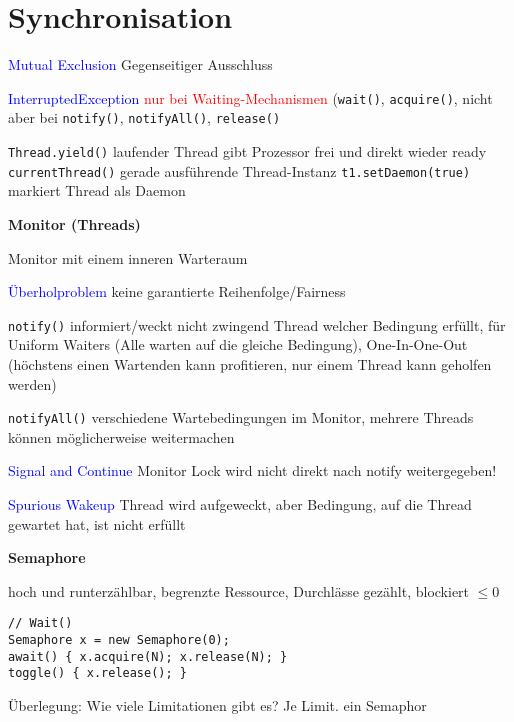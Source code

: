 \section{Synchronisation}

\textcolor{blue}{Mutual Exclusion} Gegenseitiger Ausschluss

\textcolor{blue}{InterruptedException} \textcolor{red}{nur bei Waiting-Mechanismen} (\lstinline{wait()}, \lstinline{acquire()}, nicht aber bei \lstinline{notify()}, \lstinline{notifyAll()}, \lstinline{release()}

\lstinline{Thread.yield()} laufender Thread gibt Prozessor frei und direkt wieder ready \lstinline{currentThread()} gerade ausführende Thread-Instanz \lstinline{t1.setDaemon(true)} markiert Thread als Daemon

\textbf{Monitor (Threads)}

Monitor mit einem inneren Warteraum

\textcolor{blue}{Überholproblem} keine garantierte Reihenfolge/Fairness

\lstinline{notify()} informiert/weckt nicht zwingend Thread welcher Bedingung erfüllt, für Uniform Waiters (Alle warten auf die gleiche Bedingung), One-In-One-Out (höchstens einen Wartenden kann profitieren, nur einem Thread kann geholfen werden)

\lstinline{notifyAll()} verschiedene Wartebedingungen im Monitor, mehrere Threads können möglicherweise weitermachen

\textcolor{blue}{Signal and Continue} Monitor Lock wird nicht direkt nach notify weitergegeben!

\textcolor{blue}{Spurious Wakeup} Thread wird aufgeweckt, aber Bedingung, auf die Thread gewartet hat, ist nicht erfüllt

\textbf{Semaphore}

hoch und runterzählbar, begrenzte Ressource, Durchlässe gezählt, blockiert $\le 0$

\begin{lstlisting}
// Wait()
Semaphore x = new Semaphore(0);
await() { x.acquire(N); x.release(N); }
toggle() { x.release(); }
\end{lstlisting}

Überlegung: Wie viele Limitationen gibt es? Je Limit. ein Semaphor

